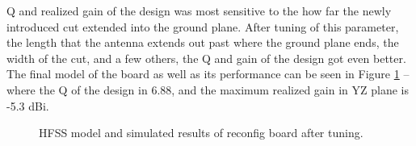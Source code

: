 \documentclass[12pt]{usfcoe}
\begin{document}
	Q and realized gain of the design was most sensitive to the how far the newly introduced cut extended into the ground plane. 
	After tuning of this parameter, the length that the antenna extends out past where the ground plane ends, the width of the cut, and a few others, the Q and gain of the design got even better.
	The final model of the board as well as its performance can be seen in Figure \ref{fig:finish_point} -- where the Q of the design in 6.88, and the maximum realized gain in YZ plane is -5.3 dBi. 

	\begin{figure}%
	    \centering
	    \break
	    \qquad
	    \caption{HFSS model and simulated results of reconfig board after tuning.}%
	    \label{fig:finish_point} 
	    \vspace{4in}
    \end{figure} 
\end{document}
